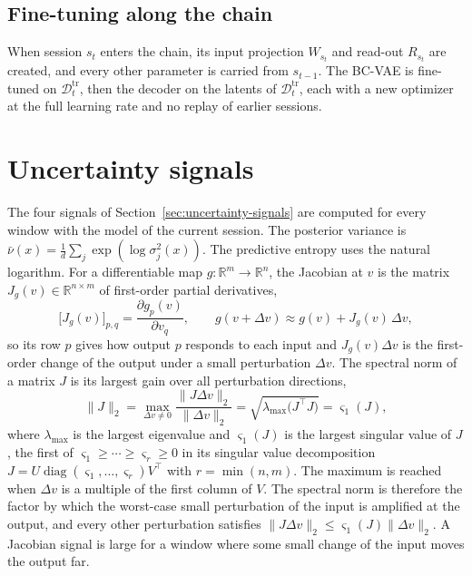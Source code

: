 \documentclass{article}
\begin{document}
\subsection{Fine-tuning along the chain}
When session $s_t$ enters the chain, its input projection $W_{s_t}$ and read-out $R_{s_t}$ are created, and every other parameter is carried from $s_{t-1}$. The BC-VAE is fine-tuned on $\mathcal{D}^{\mathrm{tr}}_t$, then the decoder on the latents of $\mathcal{D}^{\mathrm{tr}}_t$, each with a new optimizer at the full learning rate and no replay of earlier sessions.

\section{Uncertainty signals}
\label{app:signals}
The four signals of Section~\ref{sec:uncertainty-signals} are computed for every window with the model of the current session. The posterior variance is $\bar\nu(x)=\frac1d\sum_j\exp(\log\sigma_j^2(x))$. The predictive entropy uses the natural logarithm. For a differentiable map $g:\mathbb{R}^m\to\mathbb{R}^n$, the Jacobian at $v$ is the matrix $J_g(v)\in\mathbb{R}^{n\times m}$ of first-order partial derivatives,
\begin{equation}
  \big[J_g(v)\big]_{p,q}=\frac{\partial g_p(v)}{\partial v_q},\qquad g(v+\Delta v)\approx g(v)+J_g(v)\,\Delta v ,
\end{equation}
so its row $p$ gives how output $p$ responds to each input and $J_g(v)\Delta v$ is the first-order change of the output under a small perturbation $\Delta v$. The spectral norm of a matrix $J$ is its largest gain over all perturbation directions,
\begin{equation}
  \lVert J\rVert_2=\max_{\Delta v\ne0}\frac{\lVert J\Delta v\rVert_2}{\lVert\Delta v\rVert_2}=\sqrt{\lambda_{\max}\big(J^\top J\big)}=\varsigma_1(J),
\end{equation}
where $\lambda_{\max}$ is the largest eigenvalue and $\varsigma_1(J)$ is the largest singular value of $J$, the first of $\varsigma_1\ge\cdots\ge\varsigma_r\ge0$ in its singular value decomposition $J=U\operatorname{diag}(\varsigma_1,\ldots,\varsigma_r)V^\top$ with $r=\min(n,m)$. The maximum is reached when $\Delta v$ is a multiple of the first column of $V$. The spectral norm is therefore the factor by which the worst-case small perturbation of the input is amplified at the output, and every other perturbation satisfies $\lVert J\Delta v\rVert_2\le\varsigma_1(J)\lVert\Delta v\rVert_2$. A Jacobian signal is large for a window where some small change of the input moves the output far.
\end{document}
